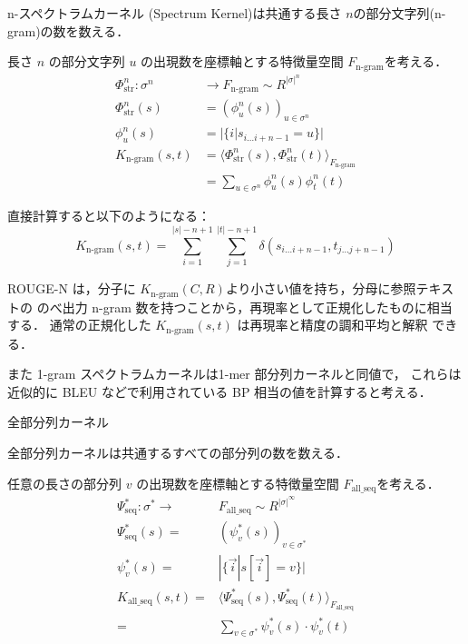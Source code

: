\documentclass[japanese]{jnlp_1.4}
\renewcommand{\paragraph}{}
\begin{document}
n-スペクトラムカーネル (Spectrum Kernel)は共通する長さ $n$の部分文字列(n-gram)の数を数える．

長さ $n$ の部分文字列 $u$ の出現数を座標軸とする特徴量空間 $F_{\mbox{n-gram}}$を考える．
\begin{align*}
\Phi^{n}_{\mbox{str}}: \sigma^{n} & \rightarrow  F_{\mbox{n-gram}} \sim R^{|\sigma|^{n}} \\
\Phi^{n}_{\mbox{str}}(s) & =  (\phi^{n}_{u}(s))_{u \in \sigma^{n}} \\
\phi^{n}_{u}(s) & =  |\{i|s_{i \ldots i + n - 1} = u\}| \\
K_{\mbox{n-gram}}(s,t) & =  \langle \Phi^{n}_{\mbox{str}} (s), \Phi^{n}_{\mbox{str}} (t) \rangle_{F_{\mbox{n-gram}}} \\
& =  \sum_{u \in \sigma^{n}} \phi^{n}_{u} (s) \phi^{n}_{t} (t) 
\end{align*}

直接計算すると以下のようになる：
\[
K_{\mbox{n-gram}}(s,t)  =  \sum^{|s|-n+1}_{i=1} \sum^{|t|-n+1}_{j=1} \delta(s_{i \ldots i + n - 1} ,t_{j \ldots j + n - 1} )
\]

ROUGE-N は，分子に $K_{\mbox{n-gram}}(C,R)$より小さい値を持ち，分母に参照テキストの
のべ出力 n-gram 数を持つことから，再現率として正規化したものに相当する．
通常の正規化した $K_{\mbox{n-gram}}(s,t)$ は再現率と精度の調和平均と解釈
できる．

また 1-gram スペクトラムカーネルは1-mer 部分列カーネルと同値で，
これらは近似的に BLEU などで利用されている BP 相当の値を計算すると考える．


\paragraph{全部分列カーネル}
\label{para:allseq-k}

全部分列カーネルは共通するすべての部分列の数を数える．

任意の長さの部分列 $v$ の出現数を座標軸とする特徴量空間 $F_{\mbox{all\_seq}}$を考える．
{\allowdisplaybreaks
\begin{align*}
\Psi^{*}_{\mbox{seq}}: \sigma^{*}  \rightarrow & F_{\mbox{all\_seq}} \sim R^{|\sigma|^{\infty}} \\
\Psi^{*}_{\mbox{seq}}(s)  = & (\psi^{*}_{v}(s))_{v \in \sigma^{*}} \\
\psi^{*}_{v}(s)  = & |\{\vec{i}|s[\vec{i}]=v\}| \\
K_{\mbox{all\_seq}}(s,t)   = & \langle \Psi^{*}_{\mbox{seq}} (s), \Psi^{*}_{\mbox{seq}} (t) \rangle_{F_{\mbox{all\_seq}}} \\
 = & \sum_{v \in \sigma^{*}} \psi^{*}_{v}(s) \cdot \psi^{*}_{v}(t) 
\end{align*}
}
\end{document}
